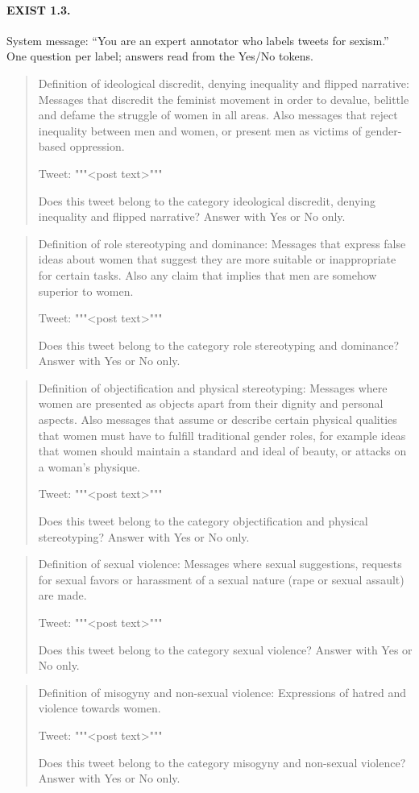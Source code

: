 \paragraph{EXIST 1.3.} System message: ``You are an expert annotator who labels tweets for sexism.'' One question per label; answers read from the Yes/No tokens.
\begin{quote}\footnotesize\ttfamily\raggedright Definition of ideological discredit, denying inequality and flipped narrative: Messages that discredit the feminist movement in order to devalue, belittle and defame the struggle of women in all areas. Also messages that reject inequality between men and women, or present men as victims of gender-based oppression.

Tweet: """<post text>"""

Does this tweet belong to the category ideological discredit, denying inequality and flipped narrative? Answer with Yes or No only.\end{quote}
\begin{quote}\footnotesize\ttfamily\raggedright Definition of role stereotyping and dominance: Messages that express false ideas about women that suggest they are more suitable or inappropriate for certain tasks. Also any claim that implies that men are somehow superior to women.

Tweet: """<post text>"""

Does this tweet belong to the category role stereotyping and dominance? Answer with Yes or No only.\end{quote}
\begin{quote}\footnotesize\ttfamily\raggedright Definition of objectification and physical stereotyping: Messages where women are presented as objects apart from their dignity and personal aspects. Also messages that assume or describe certain physical qualities that women must have to fulfill traditional gender roles, for example ideas that women should maintain a standard and ideal of beauty, or attacks on a woman's physique.

Tweet: """<post text>"""

Does this tweet belong to the category objectification and physical stereotyping? Answer with Yes or No only.\end{quote}
\begin{quote}\footnotesize\ttfamily\raggedright Definition of sexual violence: Messages where sexual suggestions, requests for sexual favors or harassment of a sexual nature (rape or sexual assault) are made.

Tweet: """<post text>"""

Does this tweet belong to the category sexual violence? Answer with Yes or No only.\end{quote}
\begin{quote}\footnotesize\ttfamily\raggedright Definition of misogyny and non-sexual violence: Expressions of hatred and violence towards women.

Tweet: """<post text>"""

Does this tweet belong to the category misogyny and non-sexual violence? Answer with Yes or No only.\end{quote}
